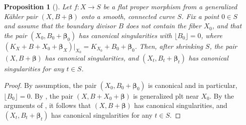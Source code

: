\documentclass[12pt]{amsart}
\numberwithin{equation}{section}
\newtheorem{proposition}[theorem]{Proposition}
\theoremstyle{definition}
\theoremstyle{plain}
\newtheorem*{thm A*}{Theorem A}
\newtheorem*{thm B*}{Theorem B}
\newtheorem*{thm C*}{Theorem C}
\newtheorem*{thm D*}{Theorem D}
\theoremstyle{definition}
\renewcommand{\1}{\mathds{1}}
\renewcommand{\>}{\rightarrow}
\begin{document}
\begin{proposition}[{\cite[Proposition 3.5]{FH11}}]\label{DefCanSing}
Let $f: X \to S$ be a flat proper morphism from a generalized K\"ahler pair $(X, B+\boldsymbol{\beta})$ onto a smooth, connected curve $S$. Fix a point $0 \in S$ and assume that the boundary divisor $B$ does not contain the fiber $X_0$, and that the pair $(X_0, B_0+\boldsymbol{\beta}_0)$ has canonical singularities with $\lfloor B_0 \rfloor = 0$, where $(K_X + B +X_0 + \boldsymbol{\beta}_X)|_{X_0} = K_{X_0} + B_0 + \boldsymbol{\beta}_0$. Then, after shrinking $S$, the pair $(X, B+\boldsymbol{\beta})$ has canonical singularities, and $(X_t, B_t+\boldsymbol{\beta}_t)$ has canonical singularities for any $t \in S$.
\end{proposition}
\begin{proof}
By assumption, the pair $(X_0, B_0+  { \boldsymbol{\beta}}_0)$ is canonical and in particular, $\lfloor B_0\rfloor = 0$. By \cite[Theorem 0.1]{HP24}, the pair $(X,B+X_0+  { \boldsymbol{\beta}})$ is generalized plt near $X_0$.  %
By the arguments of \cite[Corollary 1.4.3]{BirkarCHM}, it follows that $(X, B+ { \boldsymbol{\beta}})$ has canonical singularities, and $\left(X_t, B_t+ { \boldsymbol{\beta}}_t\right)$ has canonical singularities for any $t \in S$. 
\end{proof}
\end{document}
